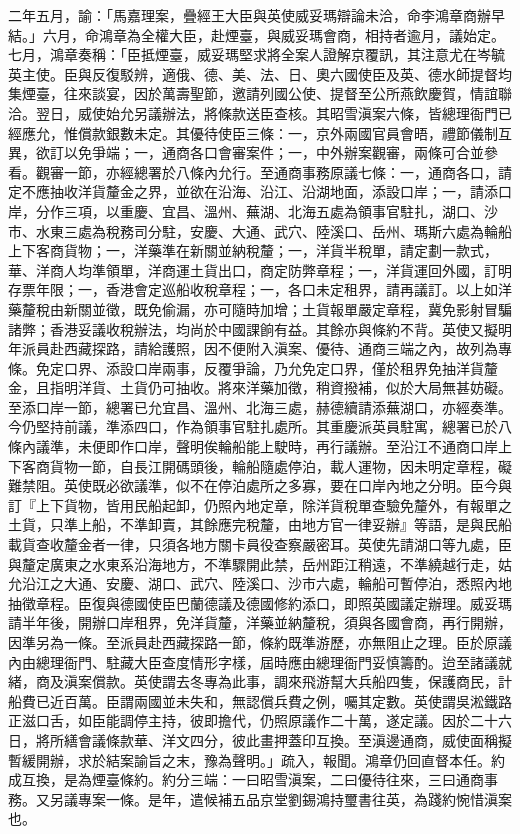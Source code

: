 \begin{pinyinscope}
二年五月，諭：「馬嘉理案，疊經王大臣與英使威妥瑪辯論未洽，命李鴻章商辦早結。」六月，命鴻章為全權大臣，赴煙臺，與威妥瑪會商，相持者逾月，議始定。七月，鴻章奏稱：「臣抵煙臺，威妥瑪堅求將全案人證解京覆訊，其注意尤在岑毓英主使。臣與反復駁辨，適俄、德、美、法、日、奧六國使臣及英、德水師提督均集煙臺，往來談宴，因於萬壽聖節，邀請列國公使、提督至公所燕飲慶賀，情誼聯洽。翌日，威使始允另議辦法，將條款送臣查核。其昭雪滇案六條，皆總理衙門已經應允，惟償款銀數未定。其優待使臣三條：一，京外兩國官員會晤，禮節儀制互異，欲訂以免爭端；一，通商各口會審案件；一，中外辦案觀審，兩條可合並參看。觀審一節，亦經總署於八條內允行。至通商事務原議七條：一，通商各口，請定不應抽收洋貨釐金之界，並欲在沿海、沿江、沿湖地面，添設口岸；一，請添口岸，分作三項，以重慶、宜昌、溫州、蕪湖、北海五處為領事官駐扎，湖口、沙市、水東三處為稅務司分駐，安慶、大通、武穴、陸溪口、岳州、瑪斯六處為輪船上下客商貨物；一，洋藥準在新關並納稅釐；一，洋貨半稅單，請定劃一款式，華、洋商人均準領單，洋商運土貨出口，商定防弊章程；一，洋貨運回外國，訂明存票年限；一，香港會定巡船收稅章程；一，各口未定租界，請再議訂。以上如洋藥釐稅由新關並徵，既免偷漏，亦可隨時加增；土貨報單嚴定章程，冀免影射冒騙諸弊；香港妥議收稅辦法，均尚於中國課餉有益。其餘亦與條約不背。英使又擬明年派員赴西藏探路，請給護照，因不便附入滇案、優待、通商三端之內，故列為專條。免定口界、添設口岸兩事，反覆爭論，乃允免定口界，僅於租界免抽洋貨釐金，且指明洋貨、土貨仍可抽收。將來洋藥加徵，稍資撥補，似於大局無甚妨礙。至添口岸一節，總署已允宜昌、溫州、北海三處，赫德續請添蕪湖口，亦經奏準。今仍堅持前議，準添四口，作為領事官駐扎處所。其重慶派英員駐寓，總署已於八條內議準，未便即作口岸，聲明俟輪船能上駛時，再行議辦。至沿江不通商口岸上下客商貨物一節，自長江開碼頭後，輪船隨處停泊，載人運物，因未明定章程，礙難禁阻。英使既必欲議準，似不在停泊處所之多寡，要在口岸內地之分明。臣今與訂『上下貨物，皆用民船起卸，仍照內地定章，除洋貨稅單查驗免釐外，有報單之土貨，只準上船，不準卸賣，其餘應完稅釐，由地方官一律妥辦』等語，是與民船載貨查收釐金者一律，只須各地方關卡員役查察嚴密耳。英使先請湖口等九處，臣與釐定廣東之水東系沿海地方，不準驟開此禁，岳州距江稍遠，不準繞越行走，姑允沿江之大通、安慶、湖口、武穴、陸溪口、沙市六處，輪船可暫停泊，悉照內地抽徵章程。臣復與德國使臣巴蘭德議及德國修約添口，即照英國議定辦理。威妥瑪請半年後，開辦口岸租界，免洋貨釐，洋藥並納釐稅，須與各國會商，再行開辦，因準另為一條。至派員赴西藏探路一節，條約既準游歷，亦無阻止之理。臣於原議內由總理衙門、駐藏大臣查度情形字樣，屆時應由總理衙門妥慎籌酌。迨至諸議就緒，商及滇案償款。英使謂去冬專為此事，調來飛游幫大兵船四隻，保護商民，計船費已近百萬。臣謂兩國並未失和，無認償兵費之例，囑其定數。英使謂吳淞鐵路正滋口舌，如臣能調停主持，彼即擔代，仍照原議作二十萬，遂定議。因於二十六日，將所繕會議條款華、洋文四分，彼此畫押蓋印互換。至滇邊通商，威使面稱擬暫緩開辦，求於結案諭旨之末，豫為聲明。」疏入，報聞。鴻章仍回直督本任。約成互換，是為煙臺條約。約分三端：一曰昭雪滇案，二曰優待往來，三曰通商事務。又另議專案一條。是年，遣候補五品京堂劉錫鴻持璽書往英，為踐約惋惜滇案也。


\end{pinyinscope}
